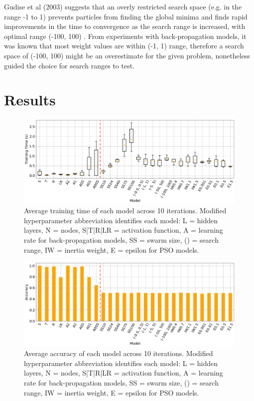 \documentclass[12pt]{article}
\begin{document}
Gudise et al (2003) suggests that an overly restricted search space (e.g. in the range -1 to 1) prevents particles from finding the global minima and finds rapid improvements in the time to convergence as the search range is increased, with optimal range (-100, 100) \cite{Gudise}. From experiments with back-propagation models, it was known that most weight values are within (-1, 1) range, therefore a search space of (-100, 100) might be an overestimate for the given problem, nonetheless guided the choice for search ranges to test.

\vspace{-1.5em}
\section{Results}
\vspace{-1.5em}


\begin{figure}[H]
  \centering
  \includegraphics[width=1\textwidth]{figs/combo_ttime.png}
  \caption{
    Average training time of each model across 10 iterations.
    Modified hyperparameter abbreviation identifies each model:
    L = hidden layers, N = nodes, S|T|R|LR = activation function,
    A = learning rate for back-propagation models, SS = swarm size, () = search range, IW = inertia weight, E = epsilon for PSO models.
  }
  \label{fig:ttime}
\end{figure}

\begin{figure}[H]
  \centering
  \includegraphics[width=1\textwidth]{figs/combo_acc.png}
  \caption{
    Average accuracy of each model across 10 iterations.
    Modified hyperparameter abbreviation identifies each model:
    L = hidden layers, N = nodes, S|T|R|LR = activation function,
    A = learning rate for back-propagation models, SS = swarm size, () = search range, IW = inertia weight, E = epsilon for PSO models.
  }
  \label{fig:accuracy}
\end{figure}
\end{document}
